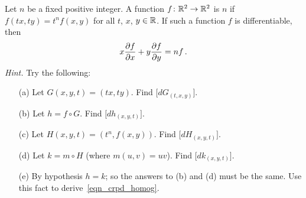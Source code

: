 \begin{prob} Let $n$ be a fixed positive integer.  A function $f \colon \mathbb{R}^2 \rightarrow \mathbb{R}^2$ is
 $n$ if $f(tx,ty) = t^nf(x,y)$ for all $t$, $x$, $y \in \mathbb{R}$.  If
such a function $f$ is differentiable, then
  \begin{equation}\label{eqn_crpd_homog}
       x \frac{\partial f}{\partial x} + y \frac{\partial f}{\partial y} = nf\,.
  \end{equation}
\emph{Hint.}  Try the following:
 \begin{enumerate}
  \item[(a)] Let $G(x,y,t) = (tx,ty)$.  Find $\bigl[dG_{(t,x,y)}\bigr]$.
  \item[(b)] Let $h = f \circ G$.  Find $\bigl[dh_{(x,y,t)}\bigr]$.
  \item[(c)] Let $H(x,y,t) = (t^n, f(x,y))$.  Find $\bigl[dH_{(x,y,t)}\bigr]$.
  \item[(d)] Let $k = m \circ H$ (where $m(u,v) = uv$).  Find $\bigl[dk_{(x,y,t)}\bigr]$.
  \item[(e)] By hypothesis $h = k$; so the answers to (b) and (d) must be the same.  Use this
fact to derive~\eqref{eqn_crpd_homog}.
 \end{enumerate}
\end{prob}





\endinput
